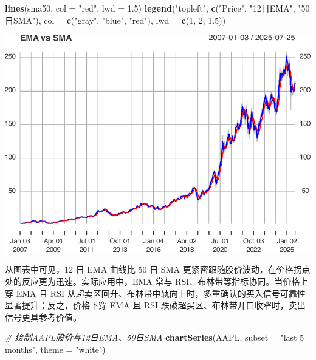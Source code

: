 \documentclass[]{ctexbook}
\newenvironment{Shaded}{\begin{snugshade}}{\end{snugshade}}
\newcommand{\AttributeTok}[1]{\textcolor[rgb]{0.13,0.29,0.53}{#1}}
\newcommand{\CommentTok}[1]{\textcolor[rgb]{0.56,0.35,0.01}{\textit{#1}}}
\newcommand{\DecValTok}[1]{\textcolor[rgb]{0.00,0.00,0.81}{#1}}
\newcommand{\FloatTok}[1]{\textcolor[rgb]{0.00,0.00,0.81}{#1}}
\newcommand{\FunctionTok}[1]{\textcolor[rgb]{0.13,0.29,0.53}{\textbf{#1}}}
\newcommand{\NormalTok}[1]{#1}
\newcommand{\StringTok}[1]{\textcolor[rgb]{0.31,0.60,0.02}{#1}}
\begin{document}
\begin{Shaded}
\begin{Highlighting}[]
\FunctionTok{lines}\NormalTok{(sma50, }\AttributeTok{col =} \StringTok{"red"}\NormalTok{, }\AttributeTok{lwd =} \FloatTok{1.5}\NormalTok{)}
\FunctionTok{legend}\NormalTok{(}\StringTok{"topleft"}\NormalTok{, }\FunctionTok{c}\NormalTok{(}\StringTok{"Price"}\NormalTok{, }\StringTok{"12日EMA"}\NormalTok{, }\StringTok{"50日SMA"}\NormalTok{), }
       \AttributeTok{col =} \FunctionTok{c}\NormalTok{(}\StringTok{"gray"}\NormalTok{, }\StringTok{"blue"}\NormalTok{, }\StringTok{"red"}\NormalTok{), }\AttributeTok{lwd =} \FunctionTok{c}\NormalTok{(}\DecValTok{1}\NormalTok{, }\DecValTok{2}\NormalTok{, }\FloatTok{1.5}\NormalTok{))}
\end{Highlighting}
\end{Shaded}

\includegraphics[width=0.9\linewidth]{QuantmodHandbook_files/figure-latex/ema-6}

从图表中可见，12 日 EMA 曲线比 50 日 SMA 更紧密跟随股价波动，在价格拐点处的反应更为迅速。实际应用中，EMA 常与 RSI、布林带等指标协同。当价格上穿 EMA 且 RSI 从超卖区回升、布林带中轨向上时，多重确认的买入信号可靠性显著提升；反之，价格下穿 EMA 且 RSI 跌破超买区、布林带开口收窄时，卖出信号更具参考价值。

\begin{Shaded}
\begin{Highlighting}[]
\CommentTok{\# 绘制AAPL股价与12日EMA、50日SMA}
\FunctionTok{chartSeries}\NormalTok{(AAPL, }\AttributeTok{subset =} \StringTok{"last 5 months"}\NormalTok{, }\AttributeTok{theme =} \StringTok{"white"}\NormalTok{)}
\end{Highlighting}
\end{Shaded}
\end{document}
